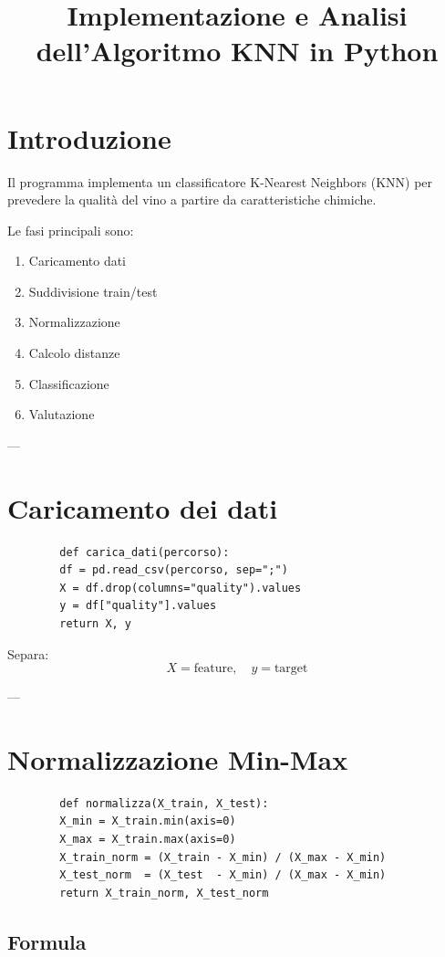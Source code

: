 \documentclass[a4paper,12pt]{article}
\title{Implementazione e Analisi dell'Algoritmo KNN in Python}
\author{}
\date{}
\begin{document}
	
	\maketitle
	
	\section{Introduzione}
	
	Il programma implementa un classificatore K-Nearest Neighbors (KNN) per prevedere la qualità del vino a partire da caratteristiche chimiche.
	
	Le fasi principali sono:
	\begin{enumerate}
		\item Caricamento dati
		\item Suddivisione train/test
		\item Normalizzazione
		\item Calcolo distanze
		\item Classificazione
		\item Valutazione
	\end{enumerate}
	
	---
	
	\section{Caricamento dei dati}
	
	\begin{lstlisting}
		def carica_dati(percorso):
		df = pd.read_csv(percorso, sep=";")
		X = df.drop(columns="quality").values
		y = df["quality"].values
		return X, y
	\end{lstlisting}
	
	Separa:
	\[
	X = \text{feature}, \quad y = \text{target}
	\]
	
	---
	
	\section{Normalizzazione Min-Max}
	
	\begin{lstlisting}
		def normalizza(X_train, X_test):
		X_min = X_train.min(axis=0)
		X_max = X_train.max(axis=0)
		X_train_norm = (X_train - X_min) / (X_max - X_min)
		X_test_norm  = (X_test  - X_min) / (X_max - X_min)
		return X_train_norm, X_test_norm
	\end{lstlisting}
	
	\subsection{Formula}
	
\end{document}
